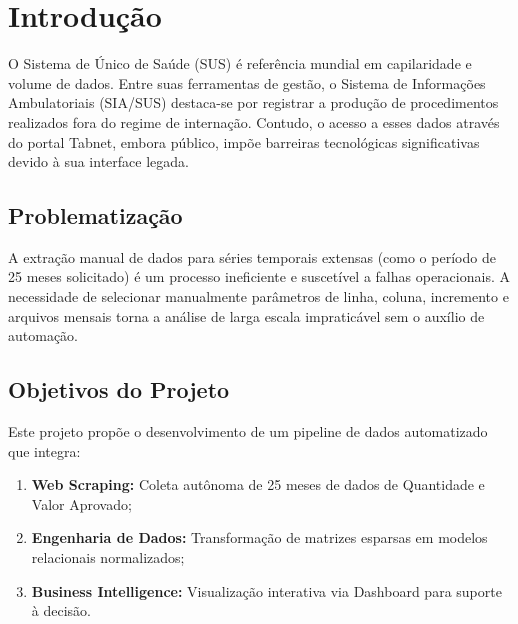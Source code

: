 ﻿\section{Introdução}
O Sistema de Único de Saúde (SUS) é referência mundial em capilaridade e volume de dados. Entre suas ferramentas de gestão, o Sistema de Informações Ambulatoriais (SIA/SUS) destaca-se por registrar a produção de procedimentos realizados fora do regime de internação. Contudo, o acesso a esses dados através do portal Tabnet, embora público, impõe barreiras tecnológicas significativas devido à sua interface legada.

\subsection{Problematização}
A extração manual de dados para séries temporais extensas (como o período de 25 meses solicitado) é um processo ineficiente e suscetível a falhas operacionais. A necessidade de selecionar manualmente parâmetros de linha, coluna, incremento e arquivos mensais torna a análise de larga escala impraticável sem o auxílio de automação.

\subsection{Objetivos do Projeto}
Este projeto propõe o desenvolvimento de um pipeline de dados automatizado que integra:
\begin{enumerate}
    \item \textbf{Web Scraping:} Coleta autônoma de 25 meses de dados de Quantidade e Valor Aprovado;
    \item \textbf{Engenharia de Dados:} Transformação de matrizes esparsas em modelos relacionais normalizados;
    \item \textbf{Business Intelligence:} Visualização interativa via Dashboard para suporte à decisão.
\end{enumerate}
